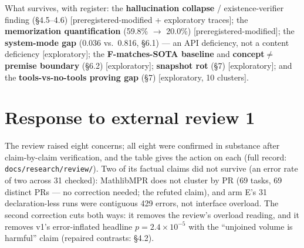 \documentclass[10pt]{article}
\newcommand{\code}[1]{\texttt{#1}}
\begin{document}
What survives, with register: the \textbf{hallucination collapse} /
existence-verifier finding (\S4.5--4.6) [preregistered-modified +
exploratory traces]; the \textbf{memorization quantification} (59.8\%
$\to$ 20.0\%) [preregistered-modified]; the \textbf{system-mode gap}
(0.036 vs.\ 0.816, \S6.1) --- an API deficiency, not a content deficiency
[exploratory]; the \textbf{F-matches-SOTA baseline} and
\textbf{concept$\neq$premise boundary} (\S6.2) [exploratory];
\textbf{snapshot rot} (\S7) [exploratory]; and the
\textbf{tools-vs-no-tools proving gap} (\S7) [exploratory, 10 clusters].

\section{Response to external review 1}\label{sec:corrections}

The review raised eight concerns; all eight were confirmed in substance
after claim-by-claim verification, and the table gives the action on each
(full record: \code{docs/research/review/}). Two of its factual claims did
not survive (an error rate of two across 31 checked): MathlibMPR does not
cluster by PR (69 tasks, 69 distinct PRs --- no correction needed; the
refuted claim), and arm E's 31 declaration-less runs were contiguous 429
errors, not interface overload. The second correction cuts both ways: it
removes the review's overload reading, and it removes v1's error-inflated
headline $p=2.4\times10^{-5}$ with the ``unjoined volume is harmful''
claim (repaired contrasts: \S4.2).
\end{document}
